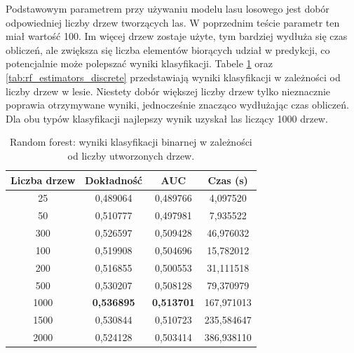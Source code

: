 \documentclass[a4paper, twoside, 11pt, openright]{article}
\begin{document}
Podstawowym parametrem przy używaniu modelu lasu losowego jest dobór odpowiedniej liczby drzew tworzących las. W poprzednim teście parametr ten miał wartość 100. Im więcej drzew zostaje użyte, tym bardziej wydłuża się czas obliczeń, ale zwiększa się liczba elementów biorących udział w predykcji, co potencjalnie może polepszać wyniki klasyfikacji. Tabele \ref{tab:rf_estimators_binary} oraz \ref{tab:rf_estimators_discrete} przedstawiają wyniki klasyfikacji w zależności od liczby drzew w lesie. Niestety dobór większej liczby drzew tylko nieznacznie poprawia otrzymywane wyniki, jednocześnie znacząco wydłużając czas obliczeń. Dla obu typów klasyfikacji najlepszy wynik uzyskał las liczący 1000 drzew.

\begin{table}[H]
    \centering
    \begin{tabular}{|c|c|c|c|}
    \hline
        \textbf{Liczba drzew} & \textbf{Dokładność} & \textbf{AUC} & \textbf{Czas (s)} \\ \hline
25         &  0,489064 &  0,489766 &    4,097520 \\ \hline
50         &  0,510777 &  0,497981 &    7,935522 \\ \hline
300        &  0,526597 &  0,509428 &   46,976032 \\ \hline
100        &  0,519908 &  0,504696 &   15,782012 \\ \hline
200        &  0,516855 &  0,500553 &   31,111518 \\ \hline
500        &  0,530207 &  0,508128 &   79,370979 \\ \hline
1000       &  \textbf{0,536895} &  \textbf{0,513701} &  167,971013 \\ \hline
1500       &  0,530844 &  0,510723 &  235,584647 \\ \hline
2000       &  0,524128 &  0,503414 &  386,938110 \\ \hline
    \end{tabular}
    \caption{Random forest: wyniki klasyfikacji binarnej w zależności od liczby utworzonych drzew.}
    \label{tab:rf_estimators_binary}
\end{table}
\end{document}
